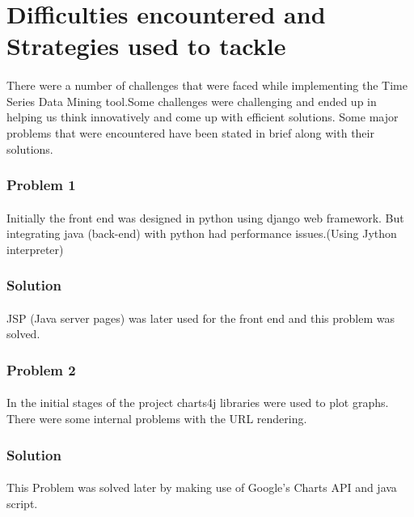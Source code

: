 \documentclass[12pt,a4paper]{report}
\begin{document}
\section{Difficulties encountered and Strategies used to tackle}

\paragraph{}There were a number of challenges that were faced while implementing the Time Series Data Mining tool.Some challenges were challenging and ended up in helping us think innovatively and come up with efficient solutions. Some major problems that were encountered have been stated in brief along with their solutions.
\subsubsection{Problem 1}
\paragraph{}Initially the front end was designed in python using django web framework. But integrating java (back-end) with python had performance issues.(Using Jython interpreter)
\subsubsection{Solution}
\paragraph{}JSP (Java server pages) was later used for the front end and this problem was solved.
\subsubsection{Problem 2}
\paragraph{}In the initial stages of the project charts4j libraries were used to plot graphs. There were some internal problems with the URL rendering.

\subsubsection{Solution}
\paragraph{}This Problem was solved later by making use of Google's Charts API and java script. 
\end{document}
